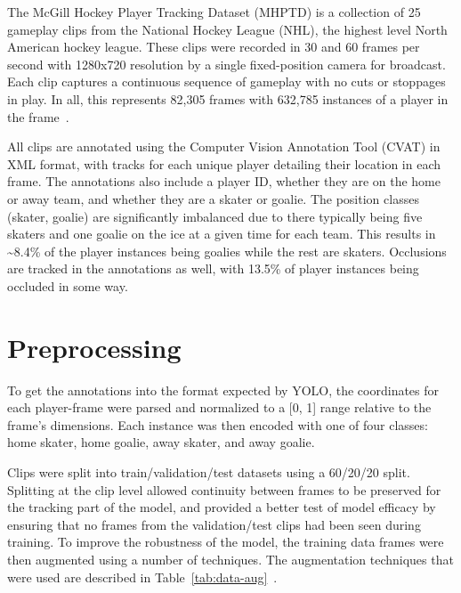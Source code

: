 \documentclass[12pt,stu,donotrepeattitle,floatsintext]{apa7}
\newcommand{\customsection}[2]{
  \phantomsection
  \section*{#1}\label{#2}
  \addcontentsline{toc}{section}{#1}
}
\begin{document}
    The McGill Hockey Player Tracking Dataset (MHPTD) is a collection of 25 gameplay clips from the National Hockey League (NHL), the highest level North American hockey league.
    These clips were recorded in 30 and 60 frames per second with 1280x720 resolution by a single fixed-position camera for broadcast.
    Each clip captures a continuous sequence of gameplay with no cuts or stoppages in play.
    In all, this represents 82,305 frames with 632,785 instances of a player in the frame~\parencite{mhptd}.

    All clips are annotated using the Computer Vision Annotation Tool (CVAT) in XML format, with tracks for each unique player detailing their location in each frame.
    The annotations also include a player ID, whether they are on the home or away team, and whether they are a skater or goalie.
    The position classes (skater, goalie) are significantly imbalanced due to there typically being five skaters and one goalie on the ice at a given time for each team.
    This results in \textasciitilde8.4\% of the player instances being goalies while the rest are skaters.
    Occlusions are tracked in the annotations as well, with 13.5\% of player instances being occluded in some way.

    \customsection{Preprocessing}{preprocessing}

    To get the annotations into the format expected by YOLO, the coordinates for each player-frame were parsed and normalized to a [0, 1] range relative to the frame's dimensions.
    Each instance was then encoded with one of four classes: home skater, home goalie, away skater, and away goalie.

    Clips were split into train/validation/test datasets using a 60/20/20 split.
    Splitting at the clip level allowed continuity between frames to be preserved for the tracking part of the model, and provided a better test of model efficacy by ensuring that no frames from the validation/test clips had been seen during training.
    To improve the robustness of the model, the training data frames were then augmented using a number of techniques.
    The augmentation techniques that were used are described in Table~\ref{tab:data-aug}~\parencite{yolo_train_docs}.
\end{document}

